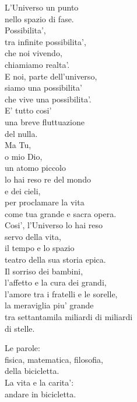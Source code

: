 \begin{haiku}
    L'Universo un punto\\
    nello spazio di fase.\\
    Possibilita',\\
    tra infinite possibilita',\\
    che noi vivendo,\\
    chiamiamo realta'.\\
    E noi, parte dell'universo,\\
    siamo una possibilita'\\
    che vive una possibilita'.\\
    E' tutto cosi' \\
    una breve fluttuazione \\
    del nulla.\\
    Ma Tu,\\
    o mio Dio,\\
    un atomo piccolo\\
    lo hai reso re del mondo\\
    e dei cieli,\\
    per proclamare la vita \\
    come tua grande e sacra opera.\\
    Cosi', l'Universo lo hai reso\\
    servo della vita,\\
    il tempo e lo spazio\\
    teatro della sua storia epica.\\
    Il sorriso dei bambini,\\
    l'affetto e la cura dei grandi,\\
    l'amore tra i fratelli e le sorelle,\\
    la meraviglia piu' grande\\
    tra settantamila miliardi di miliardi\\
    di stelle.\\
\end{haiku}

\begin{haiku}
    Le parole:\\
    fisica, matematica, filosofia,\\
    della bicicletta.\\
    La vita e la carita':\\
    andare in bicicletta.\\
\end{haiku}

